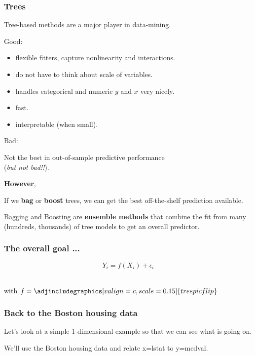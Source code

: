 \documentclass{beamer}
\newcommand{\bl}{\color{lightblue}}
\newcommand{\rd}{\color{burntorange}}
\newcommand{\bi}{\begin{itemize}}
\newcommand{\ib}{\end{itemize}}
\newcommand{\p}{\item}
\newcommand{\sk}{\vspace{.5cm}}
\newcommand{\skoo}{\vspace{.2in}}
\newcommand{\skooo}{\vspace{.3in}}
\begin{document}
\begin{frame}
	\frametitle{Trees}
	
	Tree-based methods are a major player in data-mining.\skoo

{\bl Good}:
\bi
\p flexible fitters, capture nonlinearity and interactions.
\p do not have to think about scale of variables.
\p handles categorical and numeric $y$ and $x$ very nicely.
\p fast.
\p interpretable (when small).
\ib\skoo

{\bl Bad}:

Not the best in out-of-sample predictive performance\\
\hspace*{.3in} ({\it but not bad!!}).

	
\end{frame}

	
	\begin{frame}

{\Large \bl \bf However},\skoo

If we {\rd \bf bag} or {\rd \bf boost}  trees, we can get the best off-the-shelf
prediction available.\skooo

Bagging and Boosting are {\bl \bf ensemble methods} that combine the fit from
many (hundreds, thousands) of tree models to get an overall predictor.


	
\end{frame}


\begin{frame}
	\frametitle{The overall goal ...}
	
{\Huge \[  Y_i = f(X_i) + \epsilon_i \]} \\ \sk

\hspace*{40mm}with {\Large $f = \adjincludegraphics[valign=c,scale=0.15]{treepicflip} $}


\end{frame}

\begin{frame}
\frametitle{Back to the Boston housing data}
	Let's look at a simple 1-dimensional example so that we can see what is going on.\sk\sk

We'll use the Boston housing data and relate x=lstat to y=medval.
\end{frame}
\end{document}
